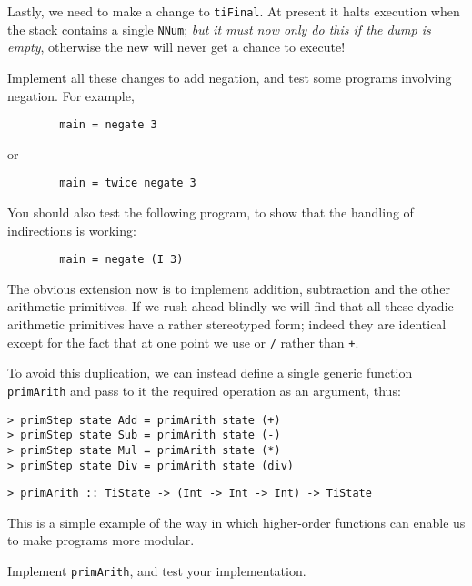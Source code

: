 Lastly, we need to make a change to \mbox{\tt tiFinal}.  At present it halts execution
when the stack contains a single \mbox{\tt NNum}; {\em but it must now only do this
if the dump is empty}, otherwise the new  will never
get a chance to execute!

\begin{exercise}
Implement all these changes to add negation,
and test some programs involving negation.
For example,
\begin{verbatim}
        main = negate 3
\end{verbatim}
or
\begin{verbatim}
        main = twice negate 3
\end{verbatim}
You should also test the following program, to show that the handling of
indirections is working:
\begin{verbatim}
        main = negate (I 3)
\end{verbatim}
\end{exercise}

The obvious extension now is to implement addition,
subtraction and the other arithmetic primitives.
If we rush ahead blindly
we will find that all these dyadic arithmetic primitives have a rather
stereotyped form; indeed they are identical except for the fact that at
one point we use \mbox{\tt *} or \mbox{\tt /} rather than \mbox{\tt +}.

To avoid this duplication, we can instead define a single generic function
\mbox{\tt primArith} and pass to it the required operation
as an argument, thus:
\begin{verbatim}
> primStep state Add = primArith state (+)
> primStep state Sub = primArith state (-)
> primStep state Mul = primArith state (*)
> primStep state Div = primArith state (div)
\end{verbatim}
%
%
%
%
\begin{verbatim}
> primArith :: TiState -> (Int -> Int -> Int) -> TiState
\end{verbatim}
%
This is a simple example of the way in which higher-order functions
 can
enable us to make programs more modular.

\begin{exercise}
Implement \mbox{\tt primArith}, and test your implementation.
\end{exercise}


